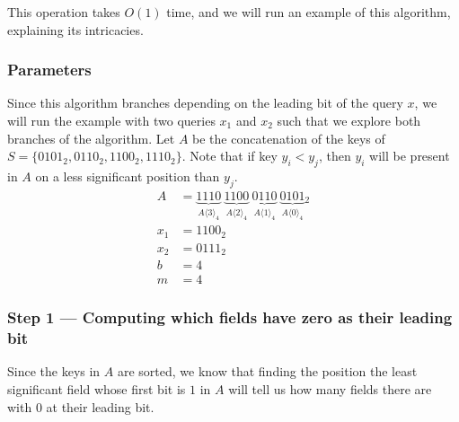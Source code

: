 This operation takes $O(1)$ time, and we will run an example of this algorithm, explaining its intricacies.

\subsubsection{Parameters}

Since this algorithm branches depending on the leading bit of the query $x$, we will run the example with two queries $x_1$ and $x_2$ such that we explore both branches of the algorithm. Let $A$ be the concatenation of the keys of $S = \{0101_2, 0110_2, 1100_2, 1110_2 \}$. Note that if key $y_i < y_j$, then $y_i$ will be present in $A$ on a less significant position than $y_j$.
\begin{align*}
    A &= \underbrace{1110}_{A\langle 3 \rangle_4}\ \underbrace{1100}_{A\langle 2 \rangle_4}\ \underbrace{0110}_{A\langle 1\rangle_4}\ \underbrace{0101}_{A\langle 0 \rangle_4}{}_2 \\
    x_1 &= 1100_2 \\
    x_2 &= 0111_2 \\
    b &= 4 \\
    m &= 4
\end{align*}

\subsubsection{Step 1 --- Computing which fields have zero as their leading bit} \label{sec:computeM}

Since the keys in $A$ are sorted, we know that finding the position the least significant field whose first bit is $1$ in $A$ will tell us how many fields there are with $0$ at their leading bit.

